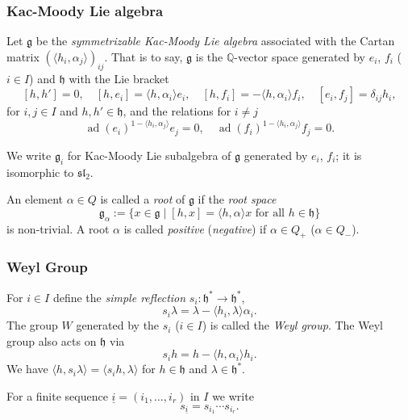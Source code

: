 \documentclass[final]{amsart}
\theoremstyle{plain}
\theoremstyle{definition}
\newcommand{\bbQ}{\mathbb Q}
\newcommand{\frakg}{\mathfrak g}
\newcommand{\frakh}{\mathfrak h}
\newcommand{\fraksl}{\mathfrak{sl}}
\newcommand{\uli}{{\underline i}}
\DeclareMathOperator{\ad}{ad}
\begin{document}
\subsubsection*{Kac-Moody Lie algebra}
\label{section:definition-kac-moody-lie-algebra}

Let $\frakg$ be the \emph{symmetrizable Kac-Moody Lie algebra} associated with the Cartan matrix $(\langle h_i, \alpha_j\rangle)_{ij}$.
That is to say, $\frakg$ is the $\bbQ$-vector space generated by $e_i$, $f_i$ ($i \in I$) and $\frakh$ with the Lie bracket
\[
    [h, h'] = 0,\quad [h, e_i] = \langle h, \alpha_i\rangle e_i,\quad [h, f_i] = -\langle h, \alpha_i\rangle f_i, \quad [e_i, f_j] = \delta_{ij} h_i,
\]
for $i, j \in I$ and $h, h' \in \frakh$, and the relations for $i \neq j$
\[
    \ad(e_i)^{1-\langle h_i, \alpha_j\rangle} e_j = 0, \quad \ad(f_i)^{1-\langle h_i, \alpha_j\rangle} f_j = 0.
\]

We write $\frakg_i$ for Kac-Moody Lie subalgebra of $\frakg$ generated by $e_i$, $f_i$; it is isomorphic to $\fraksl_2$.

An element $\alpha \in Q$ is called a \emph{root} of $\frakg$ if the \emph{root space}
\[
    \frakg_\alpha := \{ x \in \frakg \mid [h, x] = \langle h, \alpha\rangle x \text{ for all } h \in \frakh \}
\]
is non-trivial.
A root $\alpha$ is called \emph{positive} (\emph{negative}) if $\alpha \in Q_+$ ($\alpha \in Q_-$).

\subsubsection*{Weyl Group}
\label{section:definition-weyl-group}

For $i\in I$ define the \emph{simple reflection} $s_i\colon \frakh^* \to \frakh^*$,
\begin{equation}
    \label{equation:simple-reflection}
    s_i \lambda = \lambda - \langle h_i, \lambda\rangle \alpha_i.
\end{equation}
The group $W$ generated by the $s_i$ ($i\in I$) is called the \emph{Weyl group}.
The Weyl group also acts on $\frakh$ via
\begin{equation}
    s_i h = h - \langle h, \alpha_i\rangle h_i.
\end{equation}
We have $\langle h, s_i \lambda\rangle = \langle s_i h, \lambda\rangle$ for $h\in \frakh$ and $\lambda \in \frakh^*$.

For a finite sequence $\uli = (i_1, \dots, i_r)$ in $I$ we write
\begin{equation}
    s_\uli = s_{i_1} \cdots s_{i_r}.
\end{equation}
\end{document}
